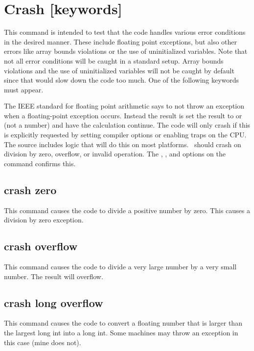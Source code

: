\section{Crash [keywords]}

This command is intended to test that the code handles various error
conditions in the desired manner. These include floating point exceptions, but
also other errors like array bounds violations or the use of uninitialized
variables. Note that not all error conditions will be caught in a standard
setup. Array bounds violations and the use of uninitialized variables will not
be caught by default since that would slow down the code too much. One of the
following keywords must appear.

The IEEE standard for floating point arithmetic says to not throw an
exception when a floating-point exception occurs.
Instead the result is
set the result to  or  (not a number)
and have the calculation continue.
The code will only crash if this is explicitly requested by
setting compiler options or enabling traps on the CPU.
The source includes
logic that will do this on most platforms.
\Cloudy\ should crash on division
by zero, overflow, or invalid operation.
The ,
, and  options
on the  command confirms this.

\subsection{crash zero}

This command causes the code to divide a positive number by zero.  This
causes a division by zero exception.

\subsection{crash overflow}

This command causes the code to divide a very large number by a very
small number.  The result will overflow.

\subsection{crash long overflow}

This command causes the code to convert a floating number that
is larger than the largest long int into a long int.  Some machines may
throw an exception in this case (mine does not).

